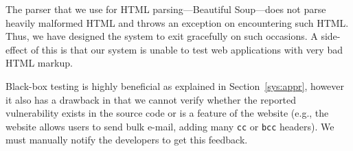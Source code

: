         The parser that we use for HTML parsing---Beautiful Soup---does not parse heavily malformed HTML and throws an exception on encountering such HTML. Thus, we have designed the system to exit gracefully on such occasions. A side-effect of this is that our system is unable to test web applications with very bad HTML markup.

        Black-box testing is highly beneficial as explained in Section~\ref{sys:appr}, however it also has a drawback in that we cannot verify whether the reported vulnerability exists in the source code or is a feature of the website (e.g., the website allows users to send bulk e-mail, adding many \texttt{cc} or \texttt{bcc} headers). We must manually notify the developers to get this feedback.




